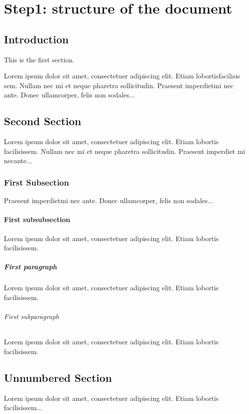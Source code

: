 \documentclass[../main.tex]{subfiles}
\begin{document}
\chapter{Step1: structure of the document}
\label{chap:tutorial1}

\section{Introduction}

This is the first section.

Lorem  ipsum  dolor  sit  amet,  consectetuer  adipiscing  
elit. Etiam  lobortisfacilisis sem.  Nullam nec mi et 
neque pharetra sollicitudin.  Praesent imperdietmi nec ante. 
Donec ullamcorper, felis non sodales...

\section{Second Section}

Lorem ipsum dolor sit amet, consectetuer adipiscing elit.  
Etiam lobortis facilisissem.  Nullam nec mi et neque pharetra 
sollicitudin.  Praesent imperdiet mi necante...

\subsection{First Subsection}
Praesent imperdietmi nec ante. Donec ullamcorper, felis non sodales...

\subsubsection{First subsubsection}
Lorem ipsum dolor sit amet, consectetuer adipiscing elit.  
Etiam lobortis facilisissem.
\paragraph{First paragraph}
Lorem ipsum dolor sit amet, consectetuer adipiscing elit.  
Etiam lobortis facilisissem.
\subparagraph{First subparagraph}
Lorem ipsum dolor sit amet, consectetuer adipiscing elit.  
Etiam lobortis facilisissem.

\section*{Unnumbered Section}
Lorem ipsum dolor sit amet, consectetuer adipiscing elit.  
Etiam lobortis facilisissem...
\end{document}
